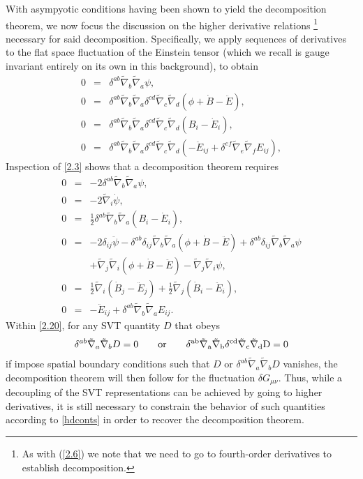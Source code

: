 With asympyotic conditions having been shown to yield the decomposition theorem, we now focus the discussion on the higher derivative relations \footnote{As with (\ref{2.6}) we note that we need to go to fourth-order derivatives to establish decomposition.} necessary for said decomposition. Specifically, we apply sequences of derivatives to the flat space fluctuation of the Einstein tensor (which we recall is gauge invariant entirely on its own in this background), to obtain
%
\begin{eqnarray}
0&=&\delta^{ab} \tilde{\nabla}_{b}\tilde{\nabla}_{a}\psi,
\nonumber\\
0&=&\delta^{ab} \tilde{\nabla}_{b}\tilde{\nabla}_{a} \delta^{cd} \tilde{\nabla}_{c}\tilde{\nabla}_{d}(\phi+\dot{B}  -\ddot{E}),
\nonumber\\
0&=&\delta^{ab} \tilde{\nabla}_{b}\tilde{\nabla}_{a} \delta^{cd} \tilde{\nabla}_{c}\tilde{\nabla}_{d}(B_i-\dot{E}_i),
\nonumber\\
0&=&\delta^{ab} \tilde{\nabla}_{b}\tilde{\nabla}_{a} \delta^{cd} \tilde{\nabla}_{c}\tilde{\nabla}_{d}(-\ddot{E}_{ij}+\delta^{ef} \tilde{\nabla}_{e}\tilde{\nabla}_{f}E_{ij}),
\label{2.19}
\end{eqnarray}
%
Inspection of \eqref{2.3} shows that a decomposition theorem requires
%
\begin{eqnarray}
0&=&- 2 \delta^{ab} \tilde{\nabla}_{b}\tilde{\nabla}_{a}\psi,
\nonumber\\
0&=&- 2 \tilde{\nabla}_{i}\dot{\psi},
\nonumber\\
0&=&\tfrac{1}{2} \delta^{ab} \tilde{\nabla}_{b}\tilde{\nabla}_{a}(B_{i} -  \dot{E}_{i}),
\nonumber\\
0&=&-2 \delta_{ij} \ddot{\psi} -  \delta^{ab} \delta_{ij} \tilde{\nabla}_{b}\tilde{\nabla}_{a}(\phi+\dot{B}  -\ddot{E})+ \delta^{ab} \delta_{ij} \tilde{\nabla}_{b}\tilde{\nabla}_{a}\psi 
\nonumber\\
&& +\tilde{\nabla}_{j}\tilde{\nabla}_{i}(\phi+\dot{B} -  \ddot{E}) - \tilde{\nabla}_{j}\tilde{\nabla}_{i}\psi,
\nonumber\\
0&=&\tfrac{1}{2} \tilde{\nabla}_{i}(\dot{B}_{j} - \ddot{E}_{j}) + \tfrac{1}{2} \tilde{\nabla}_{j}(\dot{B}_{i} 
- \ddot{E}_{i}),
\nonumber\\
0&=&- \ddot{E}_{ij} + \delta^{ab} \tilde{\nabla}_{b}\tilde{\nabla}_{a}E_{ij}.
\label{2.20}
\end{eqnarray}
%
Within \eqref{2.20}, for any SVT quantity $D$ that obeys  
\begin{eqnarray}
\delta^{ab} \tilde{\nabla}_{a}\tilde{\nabla}_{b}D=0\qquad \rm{or} \qquad \delta^{ab} \tilde{\nabla}_{a}\tilde{\nabla}_{b}\delta^{cd} \tilde{\nabla}_{c}\tilde{\nabla}_{d}D=0
\label{hdconts}
\end{eqnarray} if impose spatial boundary conditions such that $D$ or $\delta^{ab} \tilde{\nabla}_{a}\tilde{\nabla}_{b}D$ vanishes,  the decomposition theorem will then follow for the fluctuation $\delta G_{\mu\nu}$. Thus, while a decoupling of the SVT representations can be achieved by going to higher derivatives, it is still necessary to constrain the behavior of such quantities according to \eqref{hdconts} in order to recover the decomposition theorem. 

